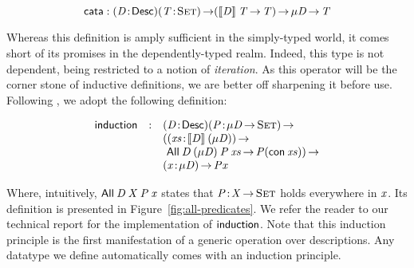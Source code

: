 \[
\F{cata} : \PITEL{\V{D}}{\Desc}
           \PI{\V{T}}{\Set}
           (\descop{\V{D}}{\V{T}} \To \V{T}) \To 
           \Mu{\V{D}} \To \V{T} 
\]

Whereas this definition is amply sufficient in the simply-typed world,
it comes short of its promises in the dependently-typed realm. Indeed,
this type is not dependent, being restricted to a notion of
\emph{iteration}. As this operator will be the corner stone of
inductive definitions, we are better off sharpening it before use.
Following \citet{benke:universe-generic-prog}, we adopt the following
definition:

\[
\begin{array}{lcl}
\F{induction} & : & \PITEL{\V{D}}{\Desc}
                    \PI{\V{P}}{\Mu{\V{D}} \To \Set}         \\
              &   & (\PI{\V{xs}}{\descop{\V{D}}{(\Mu{\V{D}})}}              \\
              &   & \ \All{\V{D}}{(\Mu{\V{D}})}{\V{P}}{\V{xs}} \To \V{P} (\Con{\V{xs}})) \To \\
              &   & \PI{\V{x}}{\Mu{\V{D}}} \V{P} \V{x}
\end{array}
\]

Where, intuitively, $\All{\V{D}}{\V{X}}{\V{P}}{\V{x}}$ states that
$\Bhab{\V{P}}{\V{X} \To \Set}$ holds everywhere in $\V{x}$. Its
definition is presented in Figure~\ref{fig:all-predicates}.  We refer
the reader to our technical report for the implementation of
$\F{induction}$. Note that this induction principle is the first
manifestation of a generic operation over descriptions. Any datatype
we define automatically comes with an induction principle.


